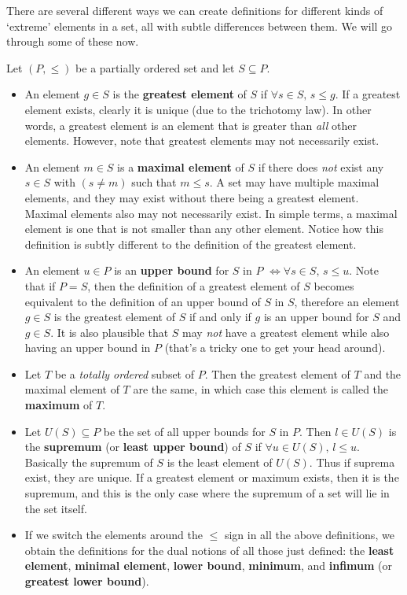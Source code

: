 \documentclass[../real_analysis.tex]{subfiles}
\begin{document}
        There are several different ways we can create definitions for different kinds of `extreme' elements in a set, all with subtle differences between them. We will go through some of these now.
        \begin{definition}
            Let $(P, \leq)$ be a partially ordered set and let $S \subseteq P$.
            \begin{itemize}
                \item An element $g \in S$ is the \textbf{greatest element} of $S$ if $\forall s \in S,\, s \leq g$. If a greatest element exists, clearly it is unique (due to the trichotomy law).
                In other words, a greatest element is an element that is greater than \textit{all} other elements. However, note that greatest elements may not necessarily exist.
                \item An element $m \in S$ is a \textbf{maximal element} of $S$ if there does \textit{not} exist any $s \in S$ with $(s \neq m)$ such that $m \leq s$. A set may have multiple maximal elements, and they may exist without there being a greatest element. Maximal elements also may not necessarily exist.
                In simple terms, a maximal element is one that is not smaller than any other element. Notice how this definition is subtly different to the definition of the greatest element.
                \item An element $u \in P$ is an \textbf{upper bound} for $S$ in $P$ $\iff \forall s \in S,\, s \leq u$.
                Note that if $P=S$, then the definition of a greatest element of $S$ becomes equivalent to the definition of an upper bound of $S$ in $S$, therefore an element $g \in S$ is the greatest element of $S$ if and only if $g$ is an upper bound for $S$ and $g \in S$. It is also plausible that $S$ may \textit{not} have a greatest element while also having an upper bound in $P$ (that's a tricky one to get your head around).
                \item Let $T$ be a \textit{totally ordered} subset of $P$. Then the greatest element of $T$ and the maximal element of $T$ are the same, in which case this element is called the \textbf{maximum} of $T$.
                \item Let $U(S) \subseteq P$ be the set of all upper bounds for $S$ in $P$. Then $l \in U(S)$ is the \textbf{supremum} (or \textbf{least upper bound}) of $S$ if $\forall u \in U(S),\, l \leq u$.
                Basically the supremum of $S$ is the least element of $U(S)$. Thus if suprema exist, they are unique. If a greatest element or maximum exists, then it is the supremum, and this is the only case where the supremum of a set will lie in the set itself.
                \item If we switch the elements around the $\leq$ sign in all the above definitions, we obtain the definitions for the dual notions of all those just defined: the \textbf{least element}, \textbf{minimal element}, \textbf{lower bound}, \textbf{minimum}, and \textbf{infimum} (or \textbf{greatest lower bound}).
            \end{itemize}
        \end{definition}


\end{document}
